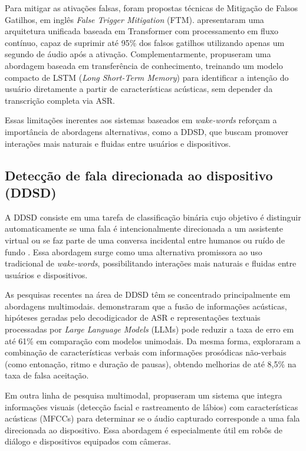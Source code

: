 \documentclass[
    12pt,                %
    openright,           %
    oneside,             %
    a4paper,             %
    english,             %
    brazil               %
]{abntex2}
\begin{document}
Para mitigar as ativações falsas, foram propostas técnicas de Mitigação de Falsos Gatilhos, em inglês \textit{False Trigger Mitigation} (FTM).  apresentaram uma arquitetura unificada baseada em Transformer com processamento em fluxo contínuo, capaz de suprimir até 95\% dos falsos gatilhos utilizando apenas um segundo de áudio após a ativação. Complementarmente,  propuseram uma abordagem baseada em transferência de conhecimento, treinando um modelo compacto de LSTM (\textit{Long Short-Term Memory}) para identificar a intenção do usuário diretamente a partir de características acústicas, sem depender da transcrição completa via ASR.

Essas limitações inerentes aos sistemas baseados em \textit{wake-words} reforçam a importância de abordagens alternativas, como a DDSD, que buscam promover interações mais naturais e fluidas entre usuários e dispositivos.

\subsection{Detecção de fala direcionada ao dispositivo (DDSD)}

A DDSD consiste em uma tarefa de classificação binária cujo objetivo é distinguir automaticamente se uma fala é intencionalmente direcionada a um assistente virtual ou se faz parte de uma conversa incidental entre humanos ou ruído de fundo \cite{Krishna2023, Wagner2024}. Essa abordagem surge como uma alternativa promissora ao uso tradicional de \textit{wake-words}, possibilitando interações mais naturais e fluidas entre usuários e dispositivos.

As pesquisas recentes na área de DDSD têm se concentrado principalmente em abordagens multimodais.  demonstraram que a fusão de informações acústicas, hipóteses geradas pelo decodigicador de ASR e representações textuais processadas por \textit{Large Language Models} (LLMs) pode reduzir a taxa de erro em até 61\% em comparação com modelos unimodais. Da mesma forma,  exploraram a combinação de características verbais com informações prosódicas não-verbais (como entonação, ritmo e duração de pausas), obtendo melhorias de até 8,5\% na taxa de falsa aceitação.

Em outra linha de pesquisa multimodal,  propuseram um sistema que integra informações visuais (detecção facial e rastreamento de lábios) com características acústicas (MFCCs) para determinar se o áudio capturado corresponde a uma fala direcionada ao dispositivo. Essa abordagem é especialmente útil em robôs de diálogo e dispositivos equipados com câmeras.
\end{document}
